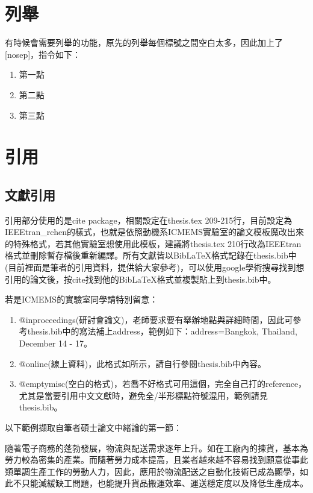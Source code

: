 \section{列舉}
\label{sec:enumerate}

有時候會需要列舉的功能，原先的列舉每個標號之間空白太多，因此加上了[nosep]，指令如下：

\begin{enumerate}[nosep]
\item 第一點
\item 第二點
\item 第三點
\end{enumerate}

\section{引用}
\label{sec:reference}

\subsection{文獻引用}

引用部分使用的是cite package，相關設定在thesis.tex 209-215行，目前設定為IEEEtran\_rchen的樣式，也就是依照動機系ICMEMS實驗室的論文模板魔改出來的特殊格式，若其他實驗室想使用此模板，建議將thesis.tex 210行改為IEEEtran格式並刪除暫存檔後重新編譯。所有文獻皆以BibLaTeX格式記錄在thesis.bib中(目前裡面是筆者的引用資料，提供給大家參考)，可以使用google學術搜尋找到想引用的論文後，按cite找到他的BibLaTeX格式並複製貼上到thesis.bib中。

若是ICMEMS的實驗室同學請特別留意：
\begin{enumerate}[nosep]
\item @inproceedings(研討會論文)，老師要求要有舉辦地點與詳細時間，因此可參考thesis.bib中的寫法補上address，範例如下：address={Bangkok, Thailand, December 14 - 17}。
\item @online(線上資料)，此格式如\cite{eurobot}所示，請自行參閱thesis.bib中內容。
\item @emptymisc(空白的格式)，若喬不好格式可用這個，完全自己打的reference，尤其是當要引用中文文獻時，避免全/半形標點符號混用，範例請見thesis.bib。
\end{enumerate}


以下範例擷取自筆者碩士論文中緒論的第一節：

隨著電子商務的蓬勃發展，物流與配送需求逐年上升。如在工廠內的揀貨，基本為勞力較為密集的產業。而隨著勞力成本提高，且業者越來越不容易找到願意從事此類單調生產工作的勞動人力，因此，應用於物流配送之自動化技術已成為顯學，如此不只能減緩缺工問題，也能提升貨品搬運效率、運送穩定度以及降低生產成本。

